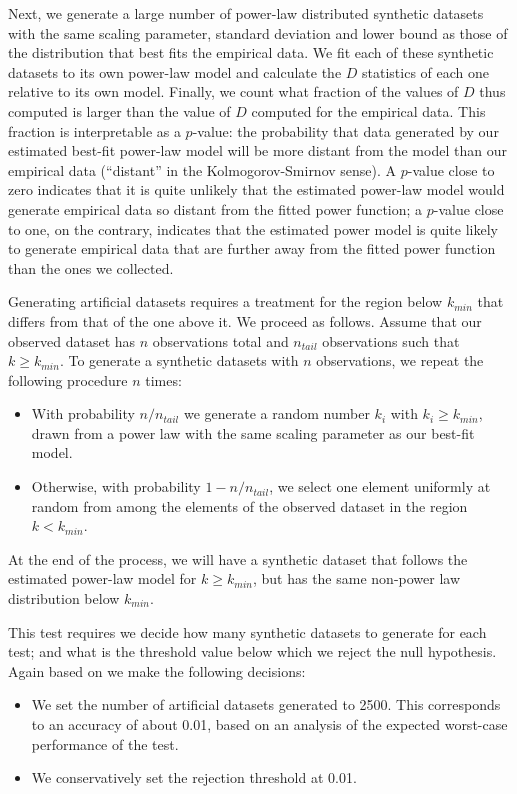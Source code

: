\documentclass{bmcart}
\begin{document}
Next, we generate a large number of power-law distributed synthetic datasets with the same scaling parameter, standard deviation and lower bound as those of the distribution that best fits the empirical data. We fit each of these synthetic datasets to its own power-law model and calculate the $D$ statistics of each one relative to its own model. Finally, we count what fraction of the values of $D$ thus computed is larger than the value of $D$ computed for the empirical data. This fraction is interpretable as a $p$-value: the probability that data generated by our estimated best-fit power-law model will be more distant from the model than our empirical data (``distant'' in the Kolmogorov-Smirnov sense). A $p$-value close to zero indicates that it is quite unlikely that the estimated power-law model would generate empirical data so distant from the fitted power function; a $p$-value close to one, on the contrary, indicates that the estimated power model is quite likely to generate empirical data that are further away from the fitted power function than the ones we collected. 

Generating artificial datasets requires a treatment for the region below $k_{min}$  that differs from that of the one above it. We proceed as follows. Assume that our observed dataset has $n$ observations total and $n_{tail}$ observations such that $k \geq k_{min}$. To generate a synthetic datasets with $n$ observations, we repeat the following procedure $n$ times:
\begin{itemize}
\item With probability $n/n_{tail}$ we generate a random number $k_i$ with $k_i \geq k_{min}$, drawn from a power law with the same scaling parameter as our best-fit model.
\item Otherwise, with probability $1 - n/n_{tail}$, we select one element uniformly at random from among the elements of the observed dataset in the region $k<k_{min}$.
\end{itemize}

At the end of the process, we will have a synthetic dataset that follows the estimated power-law model for $k \geq k_{min}$, but has the same non-power law distribution below $k_{min}$.

This test requires we decide how many synthetic datasets to generate for each test; and what is the threshold value below which we reject the null hypothesis. Again based on \cite{clauset2009power} we make the following decisions:

\begin{itemize}
\item We set the number of artificial datasets generated to 2500. This corresponds to an accuracy of about 0.01, based on an analysis of the expected worst-case performance of the test. 
\item We conservatively set the rejection threshold at 0.01.
\end{itemize}
\end{document}
